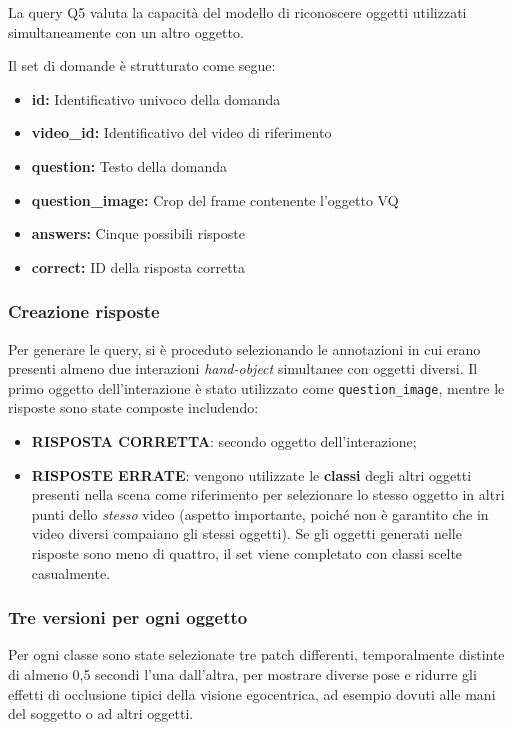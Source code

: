 La query Q5 valuta la capacità del modello di riconoscere oggetti utilizzati simultaneamente con un altro oggetto.

Il set di domande è strutturato come segue:
\begin{itemize}
    \item \textbf{id:} Identificativo univoco della domanda
    \item \textbf{video\_id:} Identificativo del video di riferimento
    \item \textbf{question:} Testo della domanda
    \item \textbf{question\_image:} Crop del frame contenente l'oggetto VQ
    \item \textbf{answers:} Cinque possibili risposte
    \item \textbf{correct:} ID della risposta corretta
\end{itemize}

\subsubsection*{Creazione risposte}
Per generare le query, si è proceduto selezionando le annotazioni in cui erano presenti almeno due interazioni \emph{hand-object} simultanee con oggetti diversi. Il primo oggetto dell'interazione è stato utilizzato come \texttt{question\_image}, mentre le risposte sono state composte includendo:

\begin{itemize}
    \item \textbf{RISPOSTA CORRETTA}: secondo oggetto dell'interazione;
    \item \textbf{RISPOSTE ERRATE}: vengono utilizzate le \textbf{classi} degli altri oggetti presenti nella scena come riferimento per selezionare lo stesso oggetto in altri punti dello \emph{stesso} video (aspetto importante, poiché non è garantito che in video diversi compaiano gli stessi oggetti). Se gli oggetti generati nelle risposte sono meno di quattro, il set viene completato con classi scelte casualmente.
\end{itemize}

\subsubsection*{Tre versioni per ogni oggetto}
Per ogni classe sono state selezionate tre patch differenti, temporalmente distinte di almeno 0,5 secondi l'una dall'altra, per mostrare diverse pose e ridurre gli effetti di occlusione tipici della visione egocentrica, ad esempio dovuti alle mani del soggetto o ad altri oggetti.

